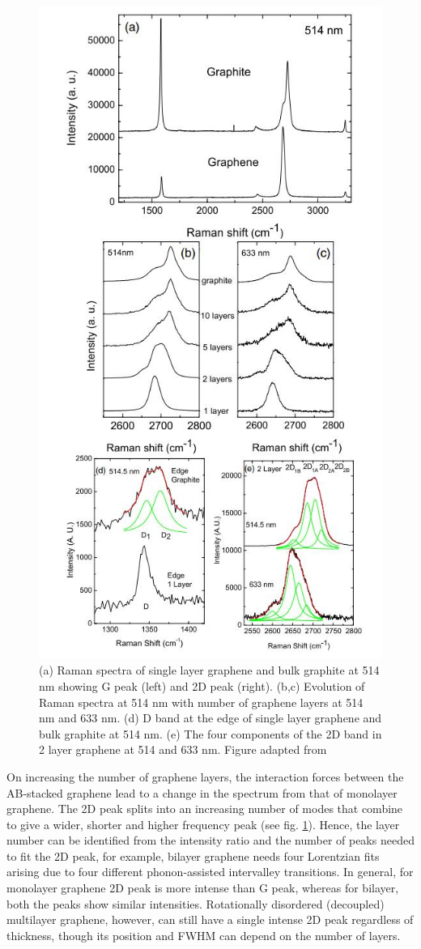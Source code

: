 \begin{figure}[H]
	\centering
	\includegraphics[width=0.7\linewidth]{figures/raman}
	\caption{ (a) Raman spectra of single layer graphene and bulk graphite at 514 nm showing G peak (left) and 2D peak (right). (b,c) Evolution of Raman spectra at 514 nm with number of graphene layers at 514 nm and 633 nm. (d) D band at the edge of single layer graphene and bulk graphite at 514 nm. (e) The four components of the 2D band in 2 layer graphene at 514 and 633 nm.  Figure adapted from \cite{Ferr}}
	\label{fig:raman}
\end{figure}

On increasing the number of graphene layers, the interaction forces between the AB-stacked graphene lead to a change in the spectrum from that of monolayer graphene. The 2D peak splits into an increasing number of modes that combine to give a wider, shorter and higher frequency peak (see fig. \ref{fig:raman}). Hence, the layer number can be identified from the intensity ratio and the number of peaks needed to fit the 2D peak, for example, bilayer graphene needs four Lorentzian fits arising due to four different phonon-assisted intervalley transitions. \cite{Ferr} In general, for monolayer graphene 2D peak is more intense than G peak, whereas for bilayer, both the peaks show similar intensities. Rotationally disordered (decoupled) multilayer graphene, however, can still have a single intense 2D peak regardless of thickness, \cite{LESPADE1984375} though its position and FWHM can depend on the number of layers. \cite{Ferr}

